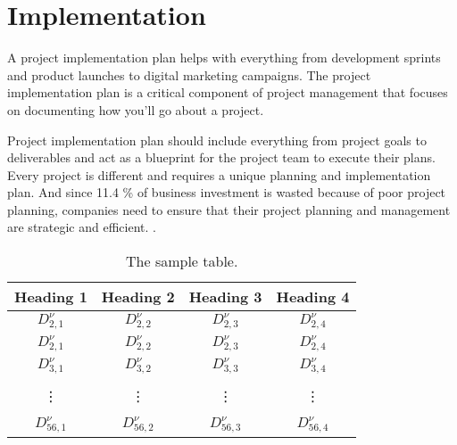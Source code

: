 


\chapter{Implementation}

 A project implementation plan helps with everything from development sprints and product launches to digital marketing campaigns. The project implementation plan is a critical component of project management that focuses on documenting how you’ll go about a project.

Project implementation plan should include everything from project goals to deliverables and act as a blueprint for the project team to execute their plans. Every project is different and requires a unique planning and implementation plan. And since 11.4 \% of business investment is wasted because of poor project planning, companies need to ensure that their project planning and management are strategic and efficient. \cite{CJ}. 
\begin{table}[h]
	\centering
	\begin{tabular}{||c|c|c|c||}  \hline
		\hline
		Heading 1 & Heading 2 & Heading 3 & Heading 4  \\
		\hline \hline
		$D_{2,1}^{\nu}$ & $D_{2,2}^{\nu}$ & $D_{2,3}^{\nu}$ & $D_{2,4}^{\nu}$  \\
		\hline
		$D_{2,1}^{\nu}$ & $D_{2,2}^{\nu}$ & $D_{2,3}^{\nu}$ & $D_{2,4}^{\nu}$  \\
		\hline
		$D_{3,1}^{\nu}$ & $D_{3,2}^{\nu}$ & $D_{3,3}^{\nu}$ & $D_{3,4}^{\nu}$  \\
		\hline
		& & & \\
		\vdots & \vdots & \vdots & \vdots \\
		& & & \\
		\hline
		$D_{56,1}^{\nu}$ & $D_{56,2}^{\nu}$ & $D_{56,3}^{\nu}$ & $D_{56,4}^{\nu}$  \\
		\hline
		\hline
	\end{tabular}
	\caption{The sample table.\label{tab:1}}
\end{table}
